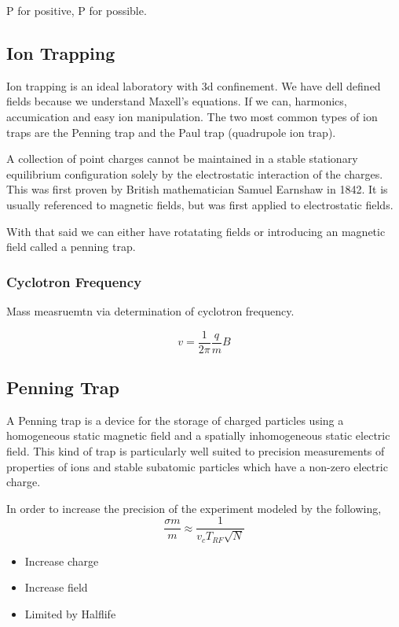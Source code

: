 \documentclass[english, 11pt]{article}
\begin{document}
\begin{center}
  P for positive, P for possible. 
\end{center}

\subsection{Ion Trapping}

Ion trapping is an ideal laboratory with 3d confinement. We have dell defined fields because we understand Maxell's equations. If we can, harmonics, accumication and easy ion manipulation. The two most common types of ion traps are the Penning trap and the Paul trap (quadrupole ion trap).

\begin{defn}
  A collection of point charges cannot be maintained in a stable stationary equilibrium configuration solely by the electrostatic interaction of the charges. This was first proven by British mathematician Samuel Earnshaw in 1842. It is usually referenced to magnetic fields, but was first applied to electrostatic fields.
\end{defn}

With that said we can either have rotatating fields or introducing an magnetic field called a penning trap.

\subsubsection{Cyclotron Frequency}

Mass measruemtn via determination of cyclotron frequency.

\[ v = \frac{1}{2\pi}\frac{q}{m}B\] 

\subsection{Penning Trap}

  A Penning trap is a device for the storage of charged particles using a homogeneous static magnetic field and a spatially inhomogeneous static electric field. This kind of trap is particularly well suited to precision measurements of properties of ions and stable subatomic particles which have a non-zero electric charge.

    \begin{defn}
    In order to increase the precision of the experiment modeled by the following,
    \[ \frac{\sigma m}{m} \approx \frac{1}{v_cT_{RF}\sqrt{N}}\]
    \begin{itemize}
      \item Increase charge
      \item Increase field
      \item Limited by Halflife
    \end{itemize}
    \end{defn}
\end{document}
